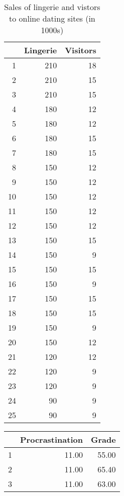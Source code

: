 \documentclass[11pt]{exam}
\begin{document}
\begin{questions}
%
\begin{table}[ht]
\begin{center}
\begin{tabular}{rrr}
  \hline
 & Lingerie & Visitors \\ 
  \hline
1 & 210 & 18 \\ 
  2 & 210 & 15 \\ 
  3 & 210 & 15 \\ 
  4 & 180 & 12 \\ 
  5 & 180 & 12 \\ 
  6 & 180 & 15 \\ 
  7 & 180 & 15 \\ 
  8 & 150 & 12 \\ 
  9 & 150 & 12 \\ 
  10 & 150 & 12 \\ 
  11 & 150 & 12 \\ 
  12 & 150 & 12 \\ 
  13 & 150 & 15 \\ 
  14 & 150 & 9 \\ 
  15 & 150 & 15 \\ 
  16 & 150 & 9 \\ 
  17 & 150 & 15 \\ 
  18 & 150 & 15 \\ 
  19 & 150 & 9 \\ 
  20 & 150 & 12 \\ 
  21 & 120 & 12 \\ 
  22 & 120 & 9 \\ 
  23 & 120 & 9 \\ 
  24 & 90 & 9 \\ 
  25 & 90 & 9 \\ 
   \hline
\end{tabular}
\caption{Sales of lingerie and vistors to online dating sites (in 1000s)}
\label{tab:lingerie}
\end{center}
\end{table}
%
\begin{table}[ht]
\begin{center}
\begin{tabular}{rrr}
  \hline
 & Procrastination & Grade \\ 
  \hline
1 & 11.00 & 55.00 \\ 
  2 & 11.00 & 65.40 \\ 
  3 & 11.00 & 63.00 \\ 

\end{tabular}
\end{center}
\end{table}
\end{questions}
\end{document}

